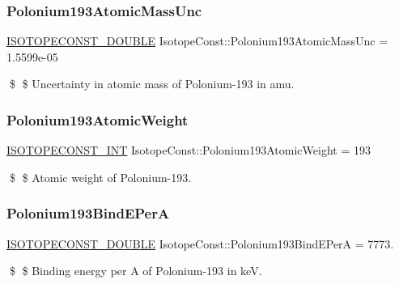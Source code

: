 \subsubsection{\texorpdfstring{Polonium193\+Atomic\+Mass\+Unc}{Polonium193AtomicMassUnc}}
{\footnotesize\ttfamily \mbox{\hyperlink{group___isotope_const-_macros_ga8f45a7272ce02c0b4c65c44636ed719a}{I\+S\+O\+T\+O\+P\+E\+C\+O\+N\+S\+T\+\_\+\+D\+O\+U\+B\+LE}} Isotope\+Const\+::\+Polonium193\+Atomic\+Mass\+Unc = 1.\+5599e-\/05}

\$ \$ Uncertainty in atomic mass of Polonium-\/193 in amu. \mbox{\label{group___isotope_const-_polonium-_po193_gaa07844586c7b46bf14afd9c99de052f5}} 
\subsubsection{\texorpdfstring{Polonium193\+Atomic\+Weight}{Polonium193AtomicWeight}}
{\footnotesize\ttfamily \mbox{\hyperlink{group___isotope_const-_macros_ga5f18360b3e99483a35c32d789e62621c}{I\+S\+O\+T\+O\+P\+E\+C\+O\+N\+S\+T\+\_\+\+I\+NT}} Isotope\+Const\+::\+Polonium193\+Atomic\+Weight = 193}

\$ \$ Atomic weight of Polonium-\/193. \mbox{\label{group___isotope_const-_polonium-_po193_ga2e7b0eb1b45c154c62714ba50147e8c2}} 
\subsubsection{\texorpdfstring{Polonium193\+Bind\+E\+PerA}{Polonium193BindEPerA}}
{\footnotesize\ttfamily \mbox{\hyperlink{group___isotope_const-_macros_ga8f45a7272ce02c0b4c65c44636ed719a}{I\+S\+O\+T\+O\+P\+E\+C\+O\+N\+S\+T\+\_\+\+D\+O\+U\+B\+LE}} Isotope\+Const\+::\+Polonium193\+Bind\+E\+PerA = 7773.}

\$ \$ Binding energy per A of Polonium-\/193 in keV. \mbox{\label{group___isotope_const-_polonium-_po193_ga6602566d29a44f3bd49953f870cf38a8}} 
